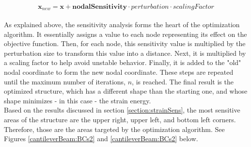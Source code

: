 \begin{equation} \label{eqn:nodalAdjustment}
    \textbf{x}_{new} = \textbf{x} + \textbf{nodalSensitivity} \cdot perturbation \cdot scalingFactor 
\end{equation}\\
As explained above, the sensitivity analysis forms the heart of the optimization algorithm. It essentially assigns a value to each node representing its effect on the objective function. Then, for each node, this sensitivity value is multiplied by the perturbation size to transform this value into a distance. Next, it is multiplied by a scaling factor to help avoid unstable behavior. Finally, it is added to the "old" nodal coordinate to form the new nodal coordinate. These steps are repeated until the maximum number of iterations, $n$, is reached. The final result is the optimized structure, which has a different shape than the starting one, and whose shape minimizes - in this case - the strain energy. \\[3pt]
Based on the results discussed in section \ref{section:strainSens}, the most sensitive areas of the structure are the upper right, upper left, and bottom left corners. Therefore, those are the areas targeted by the optimization algorithm. See Figures \ref{cantileverBeam:BCs2} and \ref{cantileverBeam:BCs2} below.\\[3pt]
